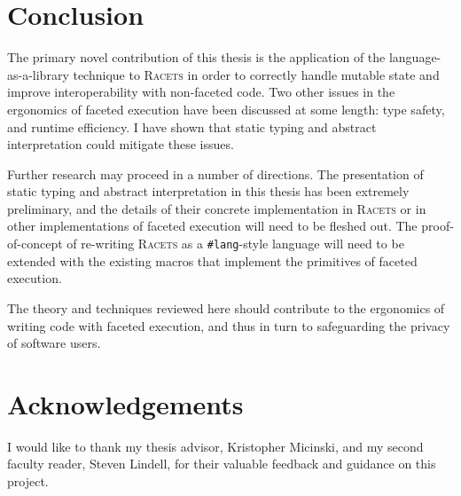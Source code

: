 \documentclass{article}
\begin{document}
\section{Conclusion\label{sec:conclusion}}
The primary novel contribution of this thesis is the application of the language-as-a-library technique to \textsc{Racets} in order to correctly handle mutable state and improve interoperability with non-faceted code. Two other issues in the ergonomics of faceted execution have been discussed at some length: type safety, and runtime efficiency. I have shown that static typing and abstract interpretation could mitigate these issues.

Further research may proceed in a number of directions. The presentation of static typing and abstract interpretation in this thesis has been extremely preliminary, and the details of their concrete implementation in \textsc{Racets} or in other implementations of faceted execution will need to be fleshed out. The proof-of-concept of re-writing \textsc{Racets} as a \texttt{\#lang}-style language will need to be extended with the existing macros that implement the primitives of faceted execution.

The theory and techniques reviewed here should contribute to the ergonomics of writing code with faceted execution, and thus in turn to safeguarding the privacy of software users.



\section*{Acknowledgements}
I would like to thank my thesis advisor, Kristopher Micinski, and my second faculty reader, Steven Lindell, for their valuable feedback and guidance on this project.




\end{document}
